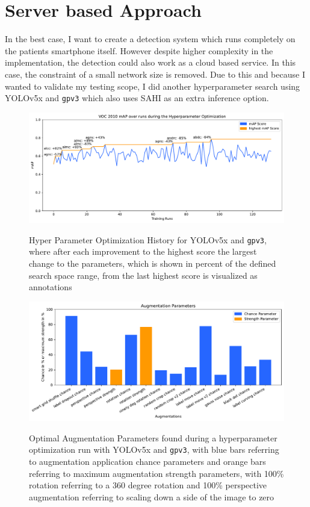 \documentclass[10pt]{book}
\begin{document}
\section{Server based Approach}

In the best case, I want to create a detection system which runs completely on the patients smartphone itself. However despite higher complexity in the implementation, the detection could also work as a cloud based service. In this case, the constraint of a small network size is removed. Due to this and because I wanted to validate my testing scope, I did another hyperparameter search using \ac{YOLO}v5x and \texttt{gpv3} which also uses \ac{SAHI} as an extra inference option.

\begin{figure}
  \caption{Hyper Parameter Optimization History for \ac{YOLO}v5x and \texttt{gpv3}, where after each improvement to the highest score the largest change to the parameters, which is shown in percent of the defined search space range, from the last highest score is visualized as annotations}
  \includegraphics[width=\textwidth]{image/hyp-param-search-yolov5x_gpv3_hyp_test-history}
  \label{fig:yolov5x_hyp_hist}
\end{figure}

\begin{figure}
  \caption{Optimal Augmentation Parameters found during a hyperparameter optimization run with \ac{YOLO}v5x and \texttt{gpv3}, with blue bars referring to augmentation application chance parameters and orange bars referring to maximum augmentation strength parameters, with 100\% rotation referring to a 360 degree rotation and 100\% perspective augmentation referring to scaling down a side of the image to zero}
  \includegraphics[width=\textwidth]{plot/best_yolov5x_hyp_run_params}
  \label{fig:optimal_yolov5x_augment_params} 
\end{figure}
\end{document}
